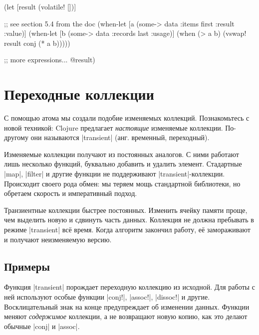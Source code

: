 \begin{english}
  \begin{clojure}
(let [result (volatile! [])]

  ;; see section 5.4 from the doc
  (when-let [a (some-> data :items first :result :value)]
    (when-let [b (some-> data :records last :usage)]
      (when (> a b)
        (vswap! result conj (* a b)))))

  ;; more expressions...
  @result)
  \end{clojure}
\end{english}

\section{Переходные коллекции}


С помощью атома мы создали подобие изменяемых коллекций. Познакомьтесь с новой
техникой: Clojure предлагает \emph{настоящие} изменяемые коллекции. По-другому
они называются \spverb|transient| (анг. временный, переходный).

Изменяемые коллекции получают из постоянных аналогов. С ними работают лишь
несколько функций, буквально добавить и удалить элемент. Стадартные
\spverb|map|, \spverb|filter| и другие функции не поддерживают
\spverb|transient|-коллекции. Происходит своего рода обмен: мы теряем мощь
стандартной библиотеки, но обретаем скорость и императивный подход.

Транзиентные коллекции быстрее постоянных. Изменить ячейку памяти проще, чем
выделить новую и сдвинуть часть данных. Коллекция не должна пребывать в режиме
\spverb|transient| вс\"{е} время. Когда алгоритм закончил работу, е\"{е}
замораживают и получают неизменяемую версию.

\subsection{Примеры}

Функция \spverb|transient| порождает переходную коллекцию из исходной. Для
работы с ней используют особые функции \spverb|conj!|, \spverb|assoc!|,
\spverb|dissoc!| и другие. Восклицательный знак на конце предупреждает об
изменении данных. Функции меняют \emph{содержимое} коллекции, а не возвращают
новую копию, как это делают обычные \spverb|conj| и \spverb|assoc|.


